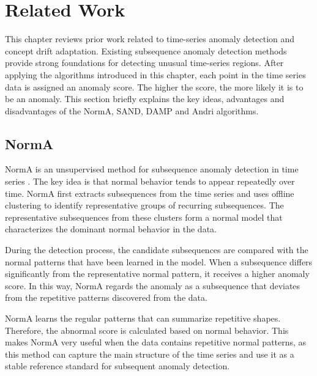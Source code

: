 \chapter{Related Work}

This chapter reviews prior work related to time-series anomaly detection and concept drift adaptation. Existing subsequence anomaly detection methods provide strong foundations for detecting unusual time-series regions. After applying the algorithms introduced in this chapter, each point in the time series data is assigned an anomaly score. The higher the score, the more likely it is to be an anomaly. This section briefly explains the key ideas, advantages and disadvantages of the NormA, SAND, DAMP and Andri algorithms.

\section{NormA}

NormA is an unsupervised method for subsequence anomaly detection in time series \citep{boniol2021norma}. The key idea is that normal behavior tends to appear repeatedly over time. NormA first extracts subsequences from the time series and uses offline clustering to identify representative groups of recurring subsequences. The representative subsequences from these clusters form a normal model that characterizes the dominant normal behavior in the data.

During the detection process, the candidate subsequences are compared with the normal patterns that have been learned in the model. When a subsequence differs significantly from the representative normal pattern, it receives a higher anomaly score. In this way, NormA regards the anomaly as a subsequence that deviates from the repetitive patterns discovered from the data.

NormA learns the regular patterns that can summarize repetitive shapes. Therefore, the abnormal score is calculated based on normal behavior. This makes NormA very useful when the data contains repetitive normal patterns, as this method can capture the main structure of the time series and use it as a stable reference standard for subsequent anomaly detection.

